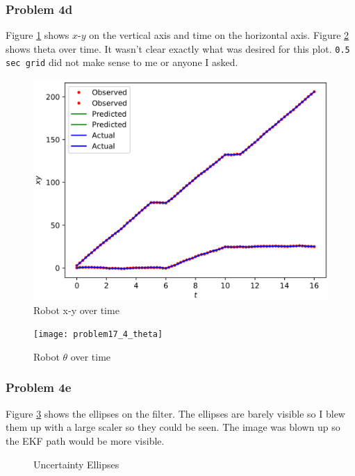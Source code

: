 \documentclass{article}
\begin{document}
\subsubsection{Problem 4d}
Figure \ref{fig:p17_4a_xyt} shows $x$-$y$ on the vertical axis and time on the 
horizontal axis. Figure \ref{fig:p17_4_theta} shows theta over time. It wasn't 
clear exactly what was desired for this plot. \verb|0.5 sec grid| did not make 
sense to me or anyone I asked.

\begin{figure}[h]
    \centering
    \includegraphics[scale=1]{problem17_4a_xy_t}
    \caption{Robot x-y over time}
    \label{fig:p17_4a_xyt}
\end{figure}

\begin{figure}[h]
    \centering
    \texttt{[image: problem17\_4\_theta]}
    \caption{Robot $\theta$ over time}
    \label{fig:p17_4_theta}
\end{figure}

\subsubsection{Problem 4e}
Figure \ref{fig:p17_4_ellipse} shows the ellipses on the filter. The ellipses 
are barely visible so I blew them up with a large scaler so they could be seen. 
The image was blown up so the EKF path would be more visible.

\begin{figure}[h]
    \centering
    \caption{Uncertainty Ellipses}
    \label{fig:p17_4_ellipse}
\end{figure}
\end{document}
